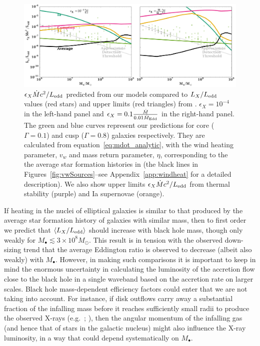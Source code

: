 \documentclass[usenatbib,fleqn]{mn2e}
\newcommand{\Mdot}{\dot{M}}
\newcommand{\MdotEdd}{\dot{M}_{\rm Edd}}
\begin{document}
\begin{figure}
\includegraphics[width=\textwidth]{miller.pdf}
\caption{\label{fig:miller} $\epsilon_X \Mdot c^2/L_{\rm edd}$ predicted
  from our models compared to $L_X/L_{\rm edd}$ values (red stars) and
  upper limits (red triangles) from \citet{Miller+15}.
  $\epsilon_X=10^{-4}$ in the left-hand panel and $\epsilon_X=0.1
  \frac{\Mdot}{0.01 \MdotEdd}$ in the right-hand panel. The green and
  blue curves represent our predictions for core ($\Gamma=0.1$)
  and cusp ($\Gamma=0.8$) galaxies respectively. They are calculated
  from equation~\eqref{eq:mdot_analytic}, with the wind heating
  parameter, $v_w$ and mass return parameter, $\eta$, corresponding to
  the the average star formation histories in
  \citet{MosterNaab+:2013a} (the black lines in
  Figures~\ref{fig:vwSources}--see
  Appendix~\ref{app:windheat} for a detailed description).
  We also show upper limits $\epsilon_X \Mdot c^2/L_{\rm edd}$ from
  thermal stability (purple) and Ia supernovae (orange).}
\end{figure}

If heating in the nuclei of elliptical galaxies is similar to that
produced by the average star formation history of galaxies with
similar mass, then to first order we predict that $\langle
L_{X}/L_{\rm edd}\rangle$ should increase with black hole mass, though
only weakly for $M_{\bullet} \lesssim 3\times 10^{8}M_{\odot}$.  This
result is in tension with the observed down-sizing trend that the
average Eddington ratio is observed to decrease (albeit also weakly)
with $M_{\bullet}$.  However, in making such comparisons it is
important to keep in mind the enormous uncertainty in calculating the
luminosity of the accretion flow close to the black hole in a single
waveband based on the accretion rate on larger scales.  Black hole
mass-dependent efficiency factors could enter that we are not taking
into account.  For instance, if disk outflows carry away a substantial
fraction of the infalling mass before it reaches sufficiently small
radii to produce the observed X-rays
(e.g.~\citealt{Blandford&Begelman99}; \citealt{Li+13}), then the
angular momentum of the infalling gas (and hence that of stars in the
galactic nucleus) might also influence the X-ray luminosity, in a way
that could depend systematically on $M_{\bullet}$.
\end{document}
